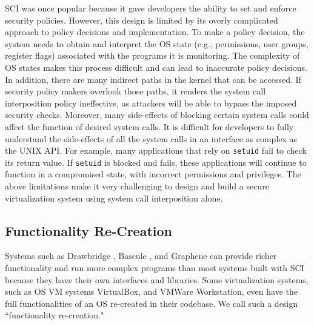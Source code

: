 SCI was once popular
because it gave developers the ability to set and enforce security policies.
However, this design is limited by its overly complicated approach to policy
decisions and implementation.
To make a policy decision, the system needs to
obtain and interpret the OS state (e.g., permissions, user groups, register flags)
associated with the programs it is monitoring.
The complexity of OS states makes this process difficult and can lead to
inaccurate policy decisions.
In addition, there are many indirect paths in the kernel that can be accessed.
If security policy makers overlook those paths, it renders the
system call interposition policy ineffective, as attackers will be able to
bypass the imposed security checks.
Moreover, many side-effects of blocking
certain system calls could affect the function of desired system calls.
It is difficult for developers to fully understand the side-effects of all the
system calls in an interface as complex as the UNIX API.
For example, many applications that rely on \texttt{setuid} fail to check its return value.
If \texttt{setuid} is blocked and fails, these applications will continue to function in a compromised state,
with incorrect permissions and privileges.
The above limitations make it very challenging to design and build a secure virtualization system using
system call interposition alone.

\subsection{Functionality Re-Creation}
Systems such as  Drawbridge \cite{Drawbridge-11},
 Bascule \cite{Bascule}, and Graphene \cite{Graphene-14} can
provide richer functionality and run more complex programs than most systems built
with SCI because they have their own
interfaces and libraries. Some virtualization
systems, such as OS VM systems VirtualBox, and VMWare Workstation, even have the
full functionalities of an OS re-created in their codebase. We call such a design
``functionality re-creation."

